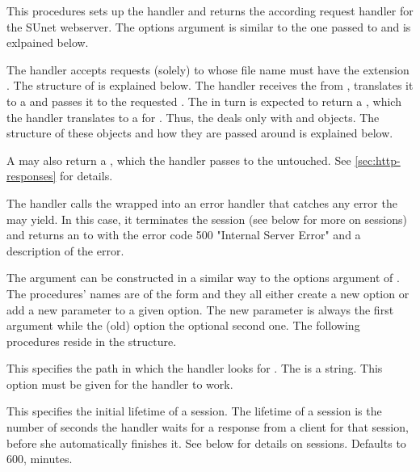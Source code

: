 \begin{desc}
  This procedures sets up the \surflet handler and returns the
  according request handler for the SUnet webserver.  The options
  argument is similar to the one passed to  and is exlpained
  below.

  The \surflet handler accepts requests (solely) to \surflets whose
  file name must have the extension .  The structure of
  \surflets is explained below.  The \surflet handler receives the
   from , translates it to a
   and passes it to the requested \surflet.  The
  \surflet in turn is expected to return a ,
  which the \surflet handler translates to a  for
  .  Thus, the \surflet deals only with 
  and  objects.  The structure of these objects
  and how they are passed around is explained below.

  A \surflet may also return a  , which the
  \surflet handler passes to the  untouched.  See
  \ref{sec:http-responses} for details.

  The \surflet handler calls the \surflet wrapped into an error
  handler that catches any error the \surflet may yield.  In this
  case, it terminates the \surflets session (see below for more on
  sessions) and returns an   to  with
  the error code 500 "Internal Server Error" and a description of
  the error.
\end{desc}

The  argument can be constructed in a similar way to the
options argument of .  The procedures' names are of the form
 and they all either create a new option or add a
new parameter to a given option.  The new parameter is always the
first argument while the (old) option the optional second one.  The
following procedures reside in the  
structure.

\begin{desc}
  This specifies the path in which the \surflet handler looks for
  \surflets.  The  is a string.  This option must be
  given for the handler to work.
\end{desc}

\begin{desc}
  This specifies the initial lifetime of a session.  The lifetime of a
  session is the number of seconds the \surflet handler waits for a
  response from a client for that session, before she automatically
  finishes it.  See below for details on sessions.  Defaults to 600,
   minutes.
\end{desc}

